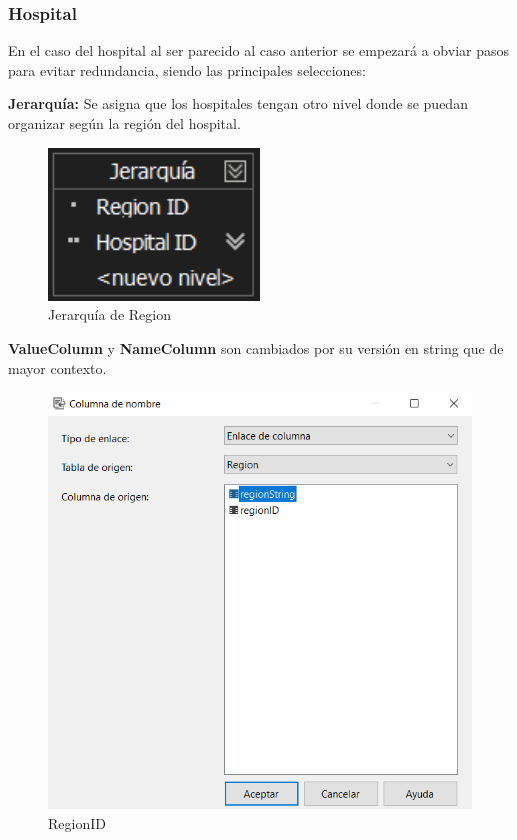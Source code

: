 \documentclass[12pt, a4paper, twoside]{article}
\begin{document}
\subsubsection{Hospital}

En el caso del hospital al ser parecido al caso anterior se empezará a obviar pasos para evitar redundancia, siendo las principales selecciones:

\textbf{Jerarquía:} Se asigna que los hospitales tengan otro nivel donde se puedan organizar según la región del hospital.

\begin{figure}[H]
	\centering
	\includegraphics[width=0.5\textwidth]{image/JRegion}
	\caption{Jerarquía de Region}
	\label{fig:15}
\end{figure}

\textbf{ValueColumn} y \textbf{NameColumn} son cambiados por su versión en string que de mayor contexto.

\begin{figure}[H]
	\centering
	\includegraphics[width=1\textwidth]{image/RegionID}
	\caption{RegionID}
	\label{fig:16}
\end{figure}
\end{document}
